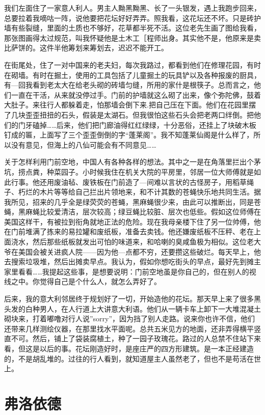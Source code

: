 我们左面住了一家意人利人。男主人黝黑黝黑、长了一头银发，遇上我跑步回来，总要拉着我嘀咕一阵，说他要把花坛好好弄弄。照我看，这花坛还不坏。只是砖护墙有些裂缝，里面的土质也不够好，花草都半死不活。这位老先生画了图给我看，那张图画得太过规范，叫我怀疑他是土木工［程师出身。其实他不是，他原来是卖比萨饼的。这件半他筹划来筹划去，迟迟不能开工。 

在街尾处，住了一对中国来的老夫妇，每次我路过，都看到他们在修理花园，有时在砌墙。有时在掘土，使用的工具包括了儿童掘土的玩具铲以及各种报废的厨具，有—回我看到老太大在给老头砌的砖墙匀缝，所用的家什是根筷子。总而言之，他们一直在干活，从来就没停过手。门前的护墙就这么砌了出来，像个弥陀佛，鼓着大肚子。来往行人都躲着走，怕那墙会倒下来.把自己压在下面。他们在花园里摆了几块歪歪扭扭的石头，假装是太湖石。但我很怕这些石头会把老两口绊倒。把他们的门牙磕掉……后来，他们把门廊油得红红绿绿，十分恶俗，还挂上了块破木板钉成的匾，上面写了三个歪歪倒倒的字“蓬莱阁”。我不知蓬莱仙阁是什么样了，所以没有意见，但海上的八仙可能会有不同意见…… 

关于怎样利用门前空地，中国人有各种各样的想法。其中之一是在角落里拦出个茅坑，捞点粪，种菜园子。小时候我住在机关大院的平房里，邻居一位大师傅就是如此行事。他还用废油毡、废铁板在门前造了—间难以言状的古怪房子，用稻草绳子、朽烂的木片等等给自己拦出片领地来，和不计其数的苍蝇快乐地共同生活。据我所见，招来的几乎全是绿荧荧的苍蝇，黑麻蝇很少来，由此可以推断出，同是苍蝇，黑麻蝇比较爱清洁，层次较高；绿豆蝇比较脏、层次也低些。假如这位师傅在美国这样干，有被拉到衔角就地正法的危险。现在我母亲楼下住了另一位帅傅，他在门前堆满了拣来的易拉罐和废纸板，准备去卖钱。他还嫌废纸板不压秤、老在上面浇水，然后那些纸板就发出可怕的味道来，和哈喇的臭咸鱼极为相似。这位老大爷在美国会被关进疯人院——因为他—点都不穷，还要攒这些破烂。每天早上，他去搜索垃圾堆，然后出摊卖早点。我认为，假如你想吃街头的早点，最好先到摊主家里看看……我提起这些事，是想要说明：门前空地虽是你自己的，但在别人的视线之中。你觉得自己是个什么人，就怎么弄好了。 

后来，我的意大利邻居终于规划好了一切，开始造他的花坛。那天早上来了很多黑头发的白种男人，在人行道上大讲意大利语。他们从一辆卡车上卸下一大堆混凝土砌块来，打着嘟噜对行人说”sorry”，因为挡了别人走路。说来你也许不信，他们还带来几样测绘仪器，在那里找水平面呢。总共五米见方的地面，还非弄得横平竖直不可。然后，铺上了袋装腐植土，种了一园子玫瑰花。路过的人总禁不住站下来看，但这是以后的事。花坛刚造好时，是座庄严的四方形建筑。是一本正经建造的，不是胡乱堆的。过往的行人看到，就知道屋主人虽然老了，但也不是苟活在世上。

\chapter{弗洛依德}

